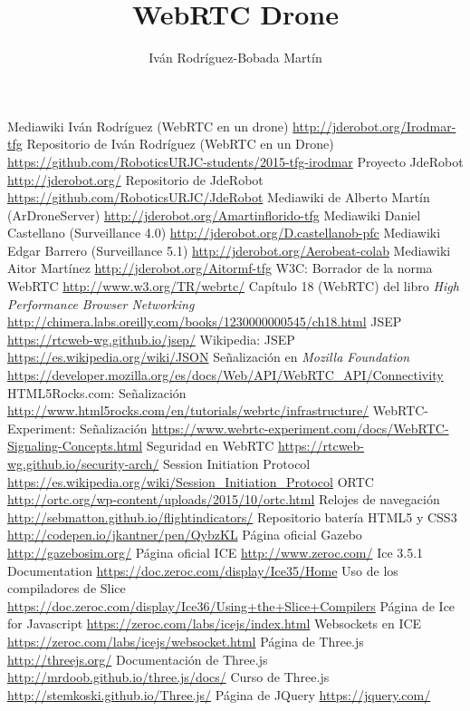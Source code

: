 \documentclass[oneside,a4paper,12pt]{book}
\title{WebRTC Drone}
\author{Iván Rodríguez-Bobada Martín}
\begin{document}







\begin{thebibliography}{99}

 Mediawiki Iván Rodríguez (WebRTC en un drone) \url{http://jderobot.org/Irodmar-tfg}
 Repositorio de Iván Rodríguez (WebRTC en un Drone) \url{https://github.com/RoboticsURJC-students/2015-tfg-irodmar} 
 Proyecto JdeRobot \url{http://jderobot.org/} 
 Repositorio de JdeRobot \url{https://github.com/RoboticsURJC/JdeRobot} 
 Mediawiki de Alberto Martín (ArDroneServer) \url{http://jderobot.org/Amartinflorido-tfg}
 Mediawiki Daniel Castellano (Surveillance 4.0) \url{http://jderobot.org/D.castellanob-pfc} 
 Mediawiki Edgar Barrero (Surveillance 5.1) \url{http://jderobot.org/Aerobeat-colab}
 Mediawiki Aitor Martínez \url{http://jderobot.org/Aitormf-tfg}
 W3C: Borrador de la norma WebRTC \url{http://www.w3.org/TR/webrtc/}
 Capítulo 18 (WebRTC) del libro \emph{High Performance Browser Networking} \url{http://chimera.labs.oreilly.com/books/1230000000545/ch18.html}
 JSEP  \url{https://rtcweb-wg.github.io/jsep/}
 Wikipedia: JSEP  \url{https://es.wikipedia.org/wiki/JSON}
 Señalización en \emph{Mozilla Foundation} \url{https://developer.mozilla.org/es/docs/Web/API/WebRTC_API/Connectivity}
 HTML5Rocks.com: Señalización \url{http://www.html5rocks.com/en/tutorials/webrtc/infrastructure/}
 WebRTC-Experiment: Señalización \url{https://www.webrtc-experiment.com/docs/WebRTC-Signaling-Concepts.html}
 Seguridad en WebRTC \url{https://rtcweb-wg.github.io/security-arch/}
 Session Initiation Protocol \url{https://es.wikipedia.org/wiki/Session_Initiation_Protocol}
 ORTC \url{http://ortc.org/wp-content/uploads/2015/10/ortc.html}
 Relojes de navegación \url{http://sebmatton.github.io/flightindicators/}
 Repositorio batería HTML5 y CSS3 \url{http://codepen.io/jkantner/pen/QybzKL}
 Página oficial Gazebo \url{http://gazebosim.org/}
 Página oficial ICE  \url{http://www.zeroc.com/}
Ice 3.5.1 Documentation  \url{https://doc.zeroc.com/display/Ice35/Home}
 Uso de los compiladores de Slice \url{https://doc.zeroc.com/display/Ice36/Using+the+Slice+Compilers}
 Página de Ice for Javascript  \url{https://zeroc.com/labs/icejs/index.html}
 Websockets en ICE \url{https://zeroc.com/labs/icejs/websocket.html}
 Página de Three.js \url{http://threejs.org/}
 Documentación de Three.js \url{http://mrdoob.github.io/three.js/docs/}
 Curso de Three.js \url{http://stemkoski.github.io/Three.js/}
 Página de JQuery \url{https://jquery.com/}
\end{thebibliography} 
\end{document}
